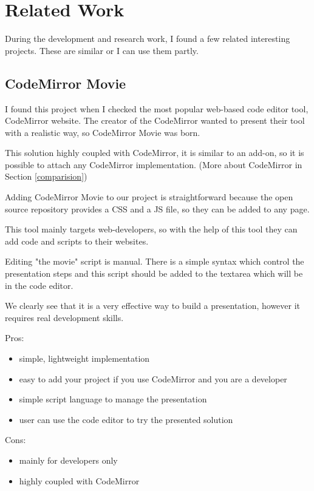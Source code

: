 \documentclass[12pt, a4paper, oneside, openright, medskipamount]{report}
\begin{document}
\chapter{Related Work}

During the development and research work, I found a few related interesting projects. These are similar or I can use them partly.

\section{CodeMirror Movie}

I found this project when I checked the most popular web-based code editor tool, CodeMirror website. The creator of the CodeMirror wanted to present their tool with a realistic way, so CodeMirror Movie was born. \cite{cm-movie}

This solution highly coupled with CodeMirror, it is similar to an add-on, so it is possible to attach any CodeMirror implementation. (More about CodeMirror in Section \ref{comparision})

Adding CodeMirror Movie to our project is straightforward because the open source repository provides a CSS and a JS file, so they can be added to any page.

This tool mainly targets web-developers, so with the help of this tool they can add code and scripts to their websites.

Editing "the movie" script is manual. There is a simple syntax which control the presentation steps and this script should be added to the textarea which will be in the code editor.

We clearly see that it is a very effective way to build a presentation, however it requires real development skills.

\noindent Pros:
\begin{itemize}[noitemsep]
\item simple, lightweight implementation
\item easy to add your project if you use CodeMirror and you are a developer
\item simple script language to manage the presentation
\item user can use the code editor to try the presented solution
\end{itemize}
Cons:
\begin{itemize}[noitemsep]
\item mainly for developers only
\item highly coupled with CodeMirror
\end{itemize}
\end{document}
